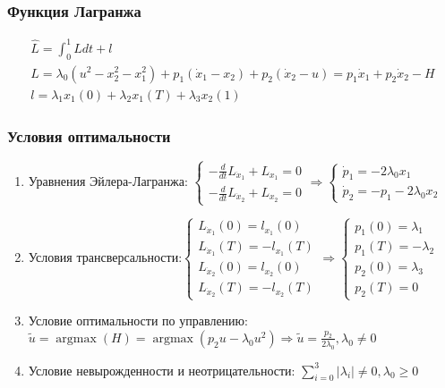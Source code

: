 \documentclass[a4paper,12pt]{article}
\DeclareMathOperator*{\argmax}{argmax}
\begin{document}
\subsubsection{Функция Лагранжа}

\begin{gather*}
  \hat{L}=\int_0^1L dt+l \\
  L=\lambda_0 \left(u^2-x_2^2-x_1^2\right)+p_1\left(\dot{x}_1-x_2\right)+p_2\left(\dot{x}_2-u\right)=p_1 \dot{x}_1+p_2 \dot{x}_2 - H \\
  l=\lambda_1 x_1(0)+\lambda_2 x_1(T)+\lambda_3 x_2(1)
\end{gather*}

\subsubsection{Условия оптимальности}

\begin{enumerate}
  \def\labelenumi{\arabic{enumi}.}
  \item
        Уравнения Эйлера-Лагранжа:
        \(
        \begin{cases}
          -\frac{d}{dt}L_{\dot{x}_1}+L_{x_1}=0 \\
          -\frac{d}{dt}L_{\dot{x}_2}+L_{x_2}=0
        \end{cases} \Rightarrow
        \begin{cases}
          \dot{p}_1=-2\lambda_0 x_1 \\
          \dot{p}_2=-p_1 - 2\lambda_0 x_2
        \end{cases}
        \)
  \item
        Условия
        трансверсальности:\(
        \begin{cases}
          L_{\dot{x}_1}(0)=l_{x_1}(0)  \\
          L_{\dot{x}_1}(T)=-l_{x_1}(T) \\
          L_{\dot{x}_2}(0)=l_{x_2}(0)  \\
          L_{\dot{x}_2}(T)=-l_{x_2}(T)
        \end{cases} \Rightarrow
        \begin{cases} p_1(0)=\lambda_1  \\
          p_1(T)=-\lambda_2 \\
          p_2(0)=\lambda_3  \\
          p_2(T)=0\end{cases}
        \)
  \item
        Условие оптимальности по управлению:
        \( \tilde{u}=\argmax(H)=\argmax\left(p_2u-\lambda_0 u^2\right) \Rightarrow \tilde{u}=\frac{p_2}{2\lambda_0}, \lambda_0 \neq 0 \)
  \item
        Условие невырожденности и неотрицательности:
        \( \sum_{i=0}^{3} |\lambda_i| \neq 0, \lambda_0 \ge 0 \)
\end{enumerate}
\end{document}
